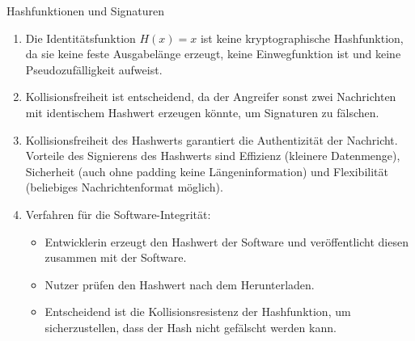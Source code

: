 \documentclass{article}
\begin{document}
\begin{exercise}{Hashfunktionen und Signaturen}
  \begin{solution}
    \begin{enumerate}
        \item Die Identitätsfunktion $ H(x) = x $ ist keine kryptographische Hashfunktion, da sie keine feste Ausgabelänge erzeugt, keine Einwegfunktion ist und keine Pseudozufälligkeit aufweist.
        \item Kollisionsfreiheit ist entscheidend, da der Angreifer sonst zwei Nachrichten mit identischem Hashwert erzeugen könnte, um Signaturen zu fälschen.
        \item Kollisionsfreiheit des Hashwerts garantiert die Authentizität der Nachricht. Vorteile des Signierens des Hashwerts sind Effizienz (kleinere Datenmenge), Sicherheit (auch ohne padding keine Längeninformation) und Flexibilität (beliebiges Nachrichtenformat möglich).
        \item Verfahren für die Software-Integrität:
        \begin{itemize}
            \item Entwicklerin erzeugt den Hashwert der Software und veröffentlicht diesen zusammen mit der Software.
            \item Nutzer prüfen den Hashwert nach dem Herunterladen.
            \item Entscheidend ist die Kollisionsresistenz der Hashfunktion, um sicherzustellen, dass der Hash nicht gefälscht werden kann.
        \end{itemize}
    \end{enumerate}
  \end{solution}
\end{exercise}
\end{document}
